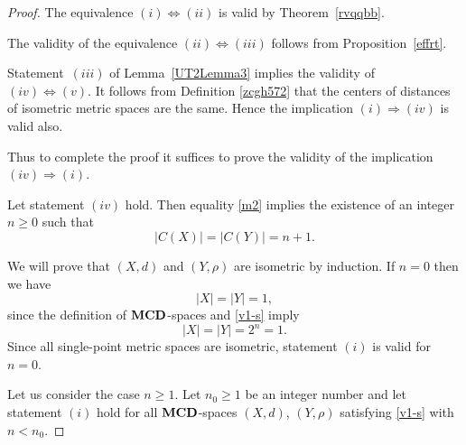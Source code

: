 \documentclass{raex}
\theoremstyle{definition}
\theoremstyle{remark}
\numberwithin{equation}{section}
\begin{document}
\begin{proof} The equivalence 
$(i)\iff (ii)$ is valid by Theorem~\ref{rvqqbb}.

The validity of the equivalence $(ii) \iff (iii)$ follows from Proposition~\ref{effrt}.

Statement~$(iii)$ of Lemma~\ref{UT2Lemma3} implies the validity of 
\(
(iv)\iff(v).
\)
 It follows from Definition \ref{zcgh572} that the centers of distances
of isometric metric spaces are the same. Hence the implication
$(i) \Rightarrow (iv)$ is valid also. 

Thus to complete the proof  it suffices
to prove the validity of the implication
$(iv) \Rightarrow (i).$


Let statement $(iv)$ hold.
Then equality \eqref{m2} implies the existence of an integer $n \ge 0$ such that
\begin{equation}
    \label{v1-s}
|C(X)| = |C(Y)| = n+1. 
\end{equation}



We will prove that $(X,d)$ and $(Y,\rho)$ are isometric by induction.
If $n=0$ then we have 
\begin{equation*}
|X| = |Y| = 1,
\end{equation*}
since the definition of ${\bf MCD}$-spaces and \eqref{v1-s} imply 
\begin{equation*}
|X| = |Y| = 2^n=1.
\end{equation*}
Since all
single-point metric spaces are isometric, statement $(i)$ is valid for  $n=0.$


Let us consider the case $n\geq 1$. Let $n_0 \geq 1$ be an integer number and let statement $(i)$ hold for all ${\bf MCD}$-spaces $(X,d)$, $(Y,\rho)$ satisfying \eqref{v1-s} with $n<n_0$. 


\end{proof}
\end{document}
